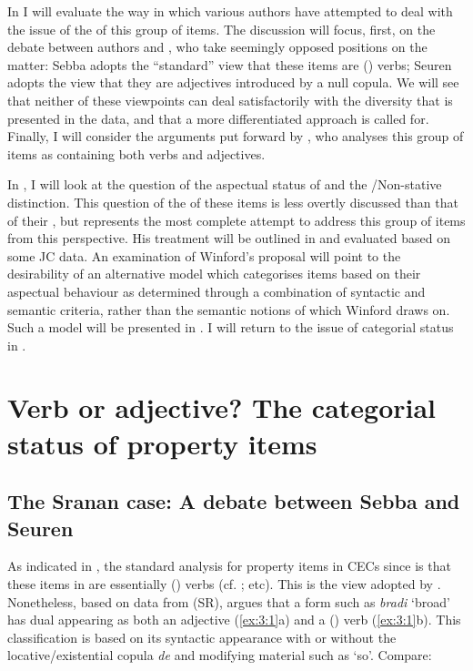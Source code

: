 In  I will evaluate the way in which various authors
have attempted to deal with the issue of the  of this
group of items.  The discussion will focus, first, on the debate
between authors \citet{Sebba1986} and \citet{Seuren1986}, who take
seemingly opposed positions on the matter: Sebba adopts the ``standard”
view that these items are () verbs; Seuren adopts
the view that they are adjectives introduced by a null copula. We will
see that neither of these viewpoints can deal satisfactorily with the
diversity that is presented in the data, and that a more
differentiated approach is called for.  Finally, I will consider the
arguments put forward by \citet{Kouwenberg1996}, who analyses this
group of items as containing both verbs and adjectives.

In , I will look at the question of the aspectual
status of  and the \slash Non-stative
distinction.  This question of the  of these items is
less overtly discussed than that of their , but
\citet{Winford1993} represents the most complete attempt to address
this group of items from this perspective.  His treatment will be
outlined in  and evaluated based on some JC data.  An examination of Winford’s proposal will point to the desirability of an
alternative model which categorises items based on their aspectual
behaviour as determined through a combination of syntactic and
semantic criteria, rather than the semantic notions of
\citet{Dixon1977} which Winford draws on.  Such a model will be
presented in .  I will return to the issue of categorial
status in .

\section{Verb or adjective? The categorial status of property
  items}\label{sec:3.1}


\subsection{The Sranan case: A debate between Sebba and
  Seuren}\label{sec:3.1.1}

As indicated in , the standard analysis for property
items in CECs since \citet{Voorhoeve1957} is that these items in
 are essentially () verbs
(cf. \citealt{Alleyne1980,Jaganauth1987}; etc).  This is the view
adopted by \citet{Sebba1986}.  Nonetheless, based on data from 
(SR), \citet{Sebba1986} argues that a form such as \textit{bradi}
`broad' has dual  appearing as both an adjective
(\ref{ex:3:1}a) and a () verb (\ref{ex:3:1}b).  This
classification is based on its syntactic appearance with or without
the locative\slash existential copula \textit{de} and modifying material
such as `so'.  Compare:

